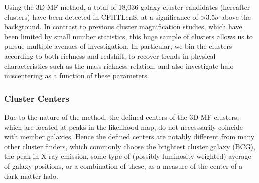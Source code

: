 Using the \ac{3D-MF} method, a total of 18,036 galaxy cluster candidates (hereafter clusters) have been detected in \ac{CFHTLenS}, at a significance of \textgreater 3.5$\sigma$ above the background. In contrast to previous cluster magnification studies, which have been limited by small number statistics, this huge sample of clusters allows us to pursue multiple avenues of investigation. In particular, we bin the clusters according to both richness and redshift, to recover trends in physical characteristics such as the mass-richness relation, and also investigate halo miscentering as a function of these parameters.

\subsubsection{Cluster Centers}
\label{centering}
Due to the nature of the method, the defined centers of the \ac{3D-MF} clusters, which are located at peaks in the likelihood map, do not necesssarily coincide with member galaxies. Hence the defined centers are notably different from many other cluster finders, which commonly choose the brightest cluster galaxy (BCG), the peak in X-ray emission, some type of (possibly luminosity-weighted) average of galaxy positions, or a combination of these, as a measure of the center of a dark matter halo.


